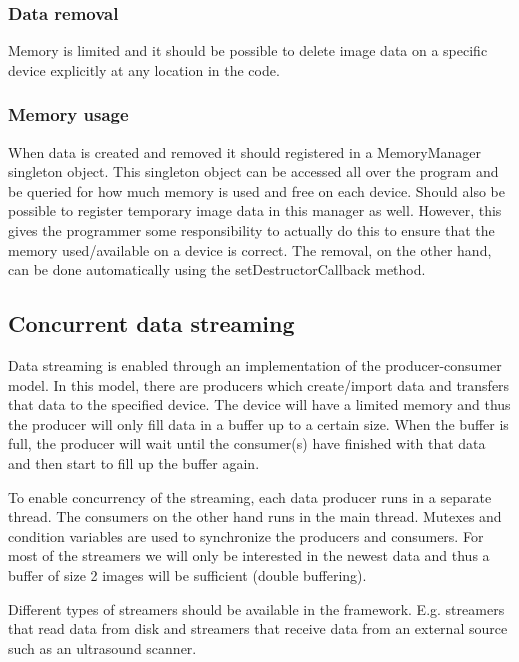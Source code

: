 \documentclass{article}
\begin{document}
\subsubsection{Data removal}

Memory is limited and it should be possible to delete image data on a specific device explicitly at any location in the code.


\subsubsection{Memory usage}

When data is created and removed it should registered in a MemoryManager singleton object.
This singleton object can be accessed all over the program and be queried for how much memory is used and free on each device.
Should also be possible to register temporary image data in this manager as well.
However, this gives the programmer some responsibility to actually do this to ensure that the memory used/available on a device is correct.
The removal, on the other hand, can be done automatically using the setDestructorCallback method.




\subsection{Concurrent data streaming}

Data streaming is enabled through an implementation of the producer-consumer model.
In this model, there are producers which create/import data and transfers that data to the specified device.
The device will have a limited memory and thus the producer will only fill data in a buffer up to a certain size.
When the buffer is full, the producer will wait until the consumer(s) have finished with that data and then start to fill up the buffer again.

To enable concurrency of the streaming, each data producer runs in a separate thread.
The consumers on the other hand runs in the main thread.
Mutexes and condition variables are used to synchronize the producers and consumers.
For most of the streamers we will only be interested in the newest data and thus a buffer of size 2 images will be sufficient (double buffering).

Different types of streamers should be available in the framework.
E.g. streamers that read data from disk and streamers that receive data from an external source such as an ultrasound scanner.
\end{document}
